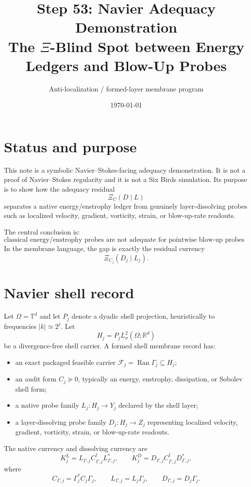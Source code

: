 \documentclass[11pt]{article}
\title{Step 53: Navier Adequacy Demonstration\\\large The \texorpdfstring{$\Xi$}{Xi}-Blind Spot between Energy Ledgers and Blow-Up Probes}
\author{Anti-localization / formed-layer membrane program}
\date{\today}
\begin{document}
\maketitle

\section*{Status and purpose}
This note is a symbolic Navier--Stokes-facing adequacy demonstration.  It is not a proof of Navier--Stokes regularity and it is not a Six Birds simulation.  Its purpose is to show how the adequacy residual
\[
\Xi_C(D\mid L)
\]
separates a native energy/enstrophy ledger from genuinely layer-dissolving probes such as localized velocity, gradient, vorticity, strain, or blow-up-rate readouts.

The central conclusion is:
\[
\boxed{\text{classical energy/enstrophy probes are not adequate for pointwise blow-up probes without additional structure.}}
\]
In the membrane language, the gap is exactly the residual currency
\[
\Xi_{C_j}(D_j\mid L_j).
\]

\section{Navier shell record}
Let $\Omega=\mathbb T^d$ and let $P_j$ denote a dyadic shell projection, heuristically to frequencies $|k|\simeq 2^j$.  Let
\[
H_j=P_j L^2_\sigma(\Omega;\mathbb R^d)
\]
be a divergence-free shell carrier.  A formed shell membrane record has:
\begin{itemize}[leftmargin=2em]
\item an exact packaged feasible carrier $\mathcal F_j=\operatorname{Ran}\Gamma_j\subseteq H_j$;
\item an audit form $C_j\succeq0$, typically an energy, enstrophy, dissipation, or Sobolev shell form;
\item a native probe family $L_j:H_j\to Y_j$ declared by the shell layer;
\item a layer-dissolving probe family $D_j:H_j\to Z_j$ representing localized velocity, gradient, vorticity, strain, or blow-up-rate readouts.
\end{itemize}

The native currency and dissolving currency are
\[
K^L_j=L_{\Gamma,j}C_{\Gamma,j}^{\dagger}L_{\Gamma,j}^*,
\qquad
K^D_j=D_{\Gamma,j}C_{\Gamma,j}^{\dagger}D_{\Gamma,j}^*,
\]
where
\[
C_{\Gamma,j}=\Gamma_j^*C_j\Gamma_j,
\qquad
L_{\Gamma,j}=L_j\Gamma_j,
\qquad
D_{\Gamma,j}=D_j\Gamma_j.
\]
\end{document}
